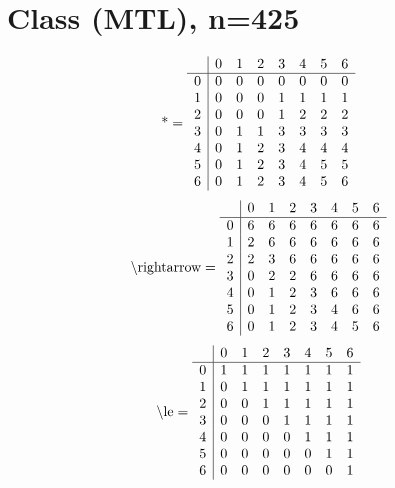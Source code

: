 \documentclass[11pt]{article}
\begin{document}
\section{Class (MTL), n=425}
\[\text{*} = 
\begin{array}{r | r r r r r r r}
 & 0 & 1 & 2 & 3 & 4 & 5 & 6 \\ \hline
0 & 0 & 0 & 0 & 0 & 0 & 0 & 0 \\
1 & 0 & 0 & 0 & 1 & 1 & 1 & 1 \\
2 & 0 & 0 & 0 & 1 & 2 & 2 & 2 \\
3 & 0 & 1 & 1 & 3 & 3 & 3 & 3 \\
4 & 0 & 1 & 2 & 3 & 4 & 4 & 4 \\
5 & 0 & 1 & 2 & 3 & 4 & 5 & 5 \\
6 & 0 & 1 & 2 & 3 & 4 & 5 & 6 \\
\end{array}
\]
\[\text{\textbackslash rightarrow} = 
\begin{array}{r | r r r r r r r}
 & 0 & 1 & 2 & 3 & 4 & 5 & 6 \\ \hline
0 & 6 & 6 & 6 & 6 & 6 & 6 & 6 \\
1 & 2 & 6 & 6 & 6 & 6 & 6 & 6 \\
2 & 2 & 3 & 6 & 6 & 6 & 6 & 6 \\
3 & 0 & 2 & 2 & 6 & 6 & 6 & 6 \\
4 & 0 & 1 & 2 & 3 & 6 & 6 & 6 \\
5 & 0 & 1 & 2 & 3 & 4 & 6 & 6 \\
6 & 0 & 1 & 2 & 3 & 4 & 5 & 6 \\
\end{array}
\]
\[\text{\textbackslash le} = 
\begin{array}{r | r r r r r r r}
 & 0 & 1 & 2 & 3 & 4 & 5 & 6 \\ \hline
0 & 1 & 1 & 1 & 1 & 1 & 1 & 1 \\
1 & 0 & 1 & 1 & 1 & 1 & 1 & 1 \\
2 & 0 & 0 & 1 & 1 & 1 & 1 & 1 \\
3 & 0 & 0 & 0 & 1 & 1 & 1 & 1 \\
4 & 0 & 0 & 0 & 0 & 1 & 1 & 1 \\
5 & 0 & 0 & 0 & 0 & 0 & 1 & 1 \\
6 & 0 & 0 & 0 & 0 & 0 & 0 & 1 \\
\end{array}
\]
\end{document}
